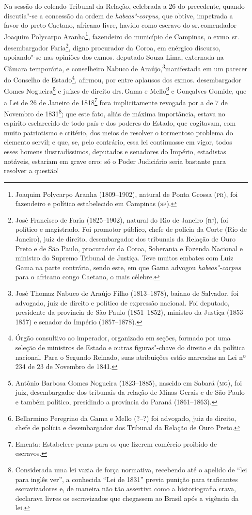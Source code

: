 Na sessão do colendo Tribunal da Relação, celebrada a 26 do precedente,
quando discutia"-se a concessão da ordem de \emph{habeas"-corpus}, que
obtive, impetrada a favor do preto Caetano, africano livre, havido como
escravo do sr.\,comendador Joaquim Polycarpo Aranha\footnote{Joaquim
  Polycarpo Aranha (1809--1902), natural de Ponta Grossa (\textsc{pr}), foi
  fazendeiro e político estabelecido em Campinas (\textsc{sp}).}, fazendeiro do
município de Campinas, o exmo.\,sr.\,desembargador Faria\footnote{José
  Francisco de Faria (1825--1902), natural do Rio de Janeiro (\textsc{rj}), foi
  político e magistrado. Foi promotor público, chefe de polícia da Corte
  (Rio de Janeiro), juiz de direito, desembargador dos tribunais da
  Relação de Ouro Preto e de São Paulo, procurador da Coroa, Soberania e
  Fazenda Nacional e ministro do Supremo Tribunal de Justiça. Teve
  muitos embates com Luiz Gama na parte contrária, sendo este, em que
  Gama advogou \emph{habeas"-corpus} para o africano congo Caetano, o
  mais célebre.}, digno procurador da Coroa, em enérgico discurso,
apoiando"-se nas opiniões dos exmos. deputado Souza Lima, externada na
Câmara temporária, e conselheiro Nabuco de Araújo,\footnote{José
  Thomaz Nabuco de Araújo Filho (1813--1878), baiano de Salvador, foi
  advogado, juiz de direito e político de expressão nacional. Foi
  deputado, presidente da província de São Paulo (1851--1852), ministro
  da Justiça (1853--1857) e senador do Império (1857--1878).}manifestada
em um parecer do Conselho de Estado\footnote{Órgão consultivo ao
  imperador, organizado em seções, formado por uma seleção de ministros
  de Estado e outras figuras"-chave do direito e da política nacional.
  Para o Segundo Reinado, suas atribuições estão marcadas na Lei nº 234
  de 23 de Novembro de 1841.}, afirmou, por entre aplausos dos exmos.
desembargador Gomes Nogueira\footnote{Antônio Barbosa Gomes Nogueira
  (1823--1885), nascido em Sabará (\textsc{mg}), foi juiz, desembargador dos
  tribunais da relação de Minas Gerais e de São Paulo e também
  político, presidindo a província do Paraná (1861--1863).} e juízes de
direito drs.\,Gama e Mello\footnote{Bellarmino Peregrino da Gama e
  Mello (?--?) foi advogado, juiz de direito, chefe de polícia e
  desembargador dos Tribunal da Relação de Ouro Preto.} e Gonçalves
Gomide, que a Lei de 26 de Janeiro de 1818\footnote{Ementa: Estabelece
  penas para os que fizerem comércio proibido de escravos.} fora
implicitamente revogada por a de 7 de Novembro de 1831\footnote{
  Considerada uma lei vazia de força normativa, recebendo até o apelido
  de ``lei para inglês ver'', a conhecida ``Lei de 1831'' previa punição
  para traficantes escravizadores e, de maneira não tão assertiva como a
  historiografia crava, declarava livres os escravizados que chegassem
  ao Brasil após a vigência da lei.}; que este fato, aliás de máxima
importância, estava no espírito esclarecido de todo país e dos poderes
do Estado, que cogitavam, com muito patriotismo e critério, dos meios de
resolver o tormentoso problema do elemento servil; e que, se, pelo
contrário, essa lei continuasse em vigor, todos esses homens
ilustradíssimos, deputados e senadores do Império, estadistas notáveis,
estariam em grave erro: só o Poder Judiciário seria bastante para
resolver a questão!

